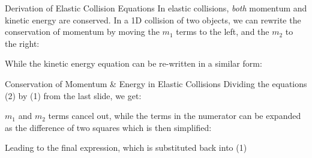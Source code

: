 \documentclass[12pt,compress,aspectratio=169]{beamer}
\begin{document}
\begin{frame}{Derivation of Elastic Collision Equations}
  In elastic collisions, \emph{both} momentum and kinetic energy are conserved.
  In a 1D collision of two objects, we can rewrite the conservation of momentum
  by moving the $m_1$ terms to the left, and the $m_2$ to the right:

  \vspace{-.3in}{\large
    \begin{align}
      \nonumber
      m_1v_1 + m_2v_2&=m_1v_1'+m_2v_2'\\
      m_1(v_1-v_1')  &= m_2(v_2'-v_2)
    \end{align}
  }

  While the kinetic energy equation can be re-written in a similar form:
  
  \vspace{-.3in}{\large
    \begin{align}
      \nonumber
      \frac12 m_1v_1^2 + \frac12 m_2v_2^2 &=\frac12 m_1v_1'^2+\frac12 m_2v_2'^2\\
      m_1(v_1^2 -v_1'^2) &=m_2(v_2'^2-v_2^2)
    \end{align}
  }
\end{frame}



\begin{frame}{Conservation of Momentum \& Energy in Elastic Collisions}
  Dividing the equations (2) by (1) from the last slide, we get:


  $m_1$ and $m_2$ terms cancel out, while the terms in the numerator can be
  expanded as the difference of two squares which is then simplified:

  
  Leading to the final expression, which is substituted back into (1)
  

\end{frame}
\end{document}
